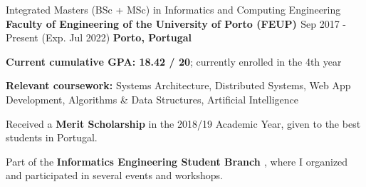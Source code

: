 

\begin{cventries}

  \cventry
    {Integrated Masters (BSc + MSc) in Informatics and Computing Engineering} %
    {\textbf{Faculty of Engineering of the University of Porto (FEUP) \href{https://sigarra.up.pt/feup/en/web_page.inicial}{\faExternalLink}}} %
    {Sep 2017 - Present (Exp. Jul 2022)} %
    {\textbf{Porto, Portugal}} %
    {
      \begin{cvitems} %
        \item {\textbf{Current cumulative GPA: 18.42 / 20}; currently enrolled in the 4th year}
        \item {\textbf{Relevant coursework:} Systems Architecture, Distributed Systems, Web App Development, Algorithms \& Data Structures, Artificial Intelligence}
        \item {Received a \textbf{Merit Scholarship} in the 2018/19 Academic Year, given to the best students in Portugal.}
        \item {Part of the \textbf{Informatics Engineering Student Branch \href{https://ni.fe.up.pt/}{\faExternalLink}}, where I organized and participated in several events and workshops.}
      \end{cvitems}
    }

\end{cventries}
